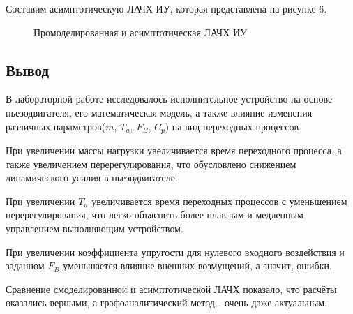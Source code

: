 \documentclass[a4paper, 12pt]{article}
\begin{document}
\par 
Составим асимптотическую ЛАЧХ ИУ, которая представлена на рисунке 6.
\newpage
\begin{figure}[h!]
	\centering
	\caption{Промоделированная и асимптотическая ЛАЧХ ИУ}
\end{figure}

\newpage
\begin{center}	
	\section*{Вывод}
\end{center}
\par 
В лабораторной работе исследовалось исполнительное устройство на основе пьезодвигателя, его математическая модель, а также влияние изменения различных параметров($m$, $T_u$, $F_B$, $C_p$) на вид переходных процессов. 
\par 
При увеличении массы нагрузки увеличивается время переходного процесса, а также увеличением перерегулирования, что обусловлено снижением динамического усилия в пьезодвигателе.
\par 
При увеличении $T_u$ увеличивается время переходных процессов с уменьшением перерегулирования, что легко объяснить более плавным и медленным управлением выполняющим устройством.
\par 
При увеличении коэффициента упругости для нулевого входного воздействия и заданном $F_B$ уменьшается влияние внешних возмущений, а значит, ошибки. 
\par 
Сравнение смоделированной и асимптотической ЛАЧХ показало, что расчёты оказались верными, а графоаналитический метод - очень даже актуальным.
\end{document}
